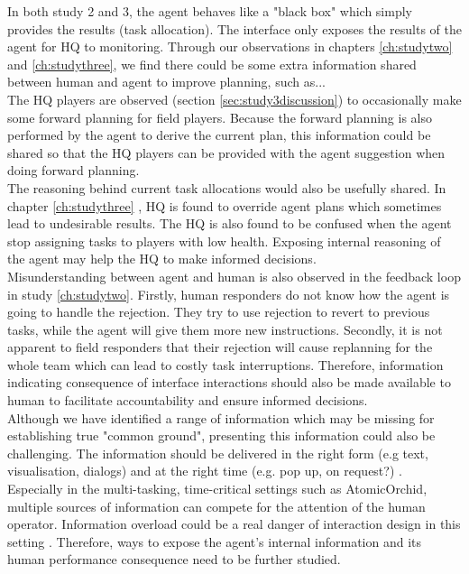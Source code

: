In both study 2 and 3, the agent behaves like a "black box" which simply provides the results (task allocation). The interface only exposes the results of the agent for HQ to monitoring. Through our observations in chapters \ref{ch:studytwo} and \ref{ch:studythree}, we find there could be some extra information shared between human and agent to improve planning, such as...\\

The HQ players are observed (section \ref{sec:study3discussion}) to occasionally make some forward planning for field players. Because the forward planning is also performed by the agent to derive the current plan, this information could be shared so that the HQ players can be provided with the agent suggestion when doing forward planning.\\

The reasoning behind current task allocations would also be usefully shared. In chapter \ref{ch:studythree} , HQ is found to override agent plans which sometimes lead to undesirable results. The HQ is also found to be confused when the agent stop assigning tasks to players with low health. Exposing internal reasoning of the agent may help the HQ to make informed decisions. \\

Misunderstanding between agent and human is also observed in the feedback loop in study \ref{ch:studytwo}. Firstly, human responders do not know how the agent is going to handle the rejection. They try to use rejection to revert to previous tasks, while the agent will give them more new instructions. Secondly, it is not apparent to field responders that their rejection will cause replanning for the whole team which can lead to costly task interruptions. Therefore, information indicating consequence of interface interactions should also be made available to human to facilitate accountability and ensure informed decisions. \\

Although we have identified a range of information which may be missing for establishing true "common ground", presenting this information could also be challenging. The information should be delivered in the right form (e.g text, visualisation, dialogs) and at the right time (e.g. pop up, on request?) \citep{Carver2007}. Especially in the multi-tasking, time-critical settings such as AtomicOrchid, multiple sources of information can compete for the attention of the human operator. Information overload could be a real danger of interaction design in this setting \citep{Lieberman2003}. Therefore, ways to expose the agent's internal information and its human performance consequence need to be further studied.   \\

